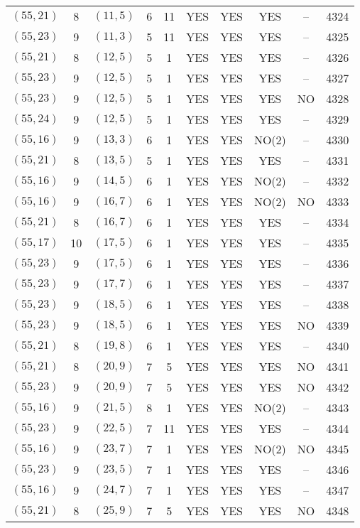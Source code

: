 \begin{longtable}{|c|c|c|c|c|c|c|c|c|c|}
$(55, 21)$ & 8 & $(11, 5)$ & 6 & 11 & YES & YES & YES & -- & 4324\\
$(55, 23)$ & 9 & $(11, 3)$ & 5 & 11 & YES & YES & YES & -- & 4325\\
$(55, 21)$ & 8 & $(12, 5)$ & 5 & 1 & YES & YES & YES & -- & 4326\\
$(55, 23)$ & 9 & $(12, 5)$ & 5 & 1 & YES & YES & YES & -- & 4327\\
$(55, 23)$ & 9 & $(12, 5)$ & 5 & 1 & YES & YES & YES & NO & 4328\\
$(55, 24)$ & 9 & $(12, 5)$ & 5 & 1 & YES & YES & YES & -- & 4329\\
$(55, 16)$ & 9 & $(13, 3)$ & 6 & 1 & YES & YES & NO(2) & -- & 4330\\
$(55, 21)$ & 8 & $(13, 5)$ & 5 & 1 & YES & YES & YES & -- & 4331\\
$(55, 16)$ & 9 & $(14, 5)$ & 6 & 1 & YES & YES & NO(2) & -- & 4332\\
$(55, 16)$ & 9 & $(16, 7)$ & 6 & 1 & YES & YES & NO(2) & NO & 4333\\
$(55, 21)$ & 8 & $(16, 7)$ & 6 & 1 & YES & YES & YES & -- & 4334\\
$(55, 17)$ & 10 & $(17, 5)$ & 6 & 1 & YES & YES & YES & -- & 4335\\
$(55, 23)$ & 9 & $(17, 5)$ & 6 & 1 & YES & YES & YES & -- & 4336\\
$(55, 23)$ & 9 & $(17, 7)$ & 6 & 1 & YES & YES & YES & -- & 4337\\
$(55, 23)$ & 9 & $(18, 5)$ & 6 & 1 & YES & YES & YES & -- & 4338\\
$(55, 23)$ & 9 & $(18, 5)$ & 6 & 1 & YES & YES & YES & NO & 4339\\
$(55, 21)$ & 8 & $(19, 8)$ & 6 & 1 & YES & YES & YES & -- & 4340\\
$(55, 21)$ & 8 & $(20, 9)$ & 7 & 5 & YES & YES & YES & NO & 4341\\
$(55, 23)$ & 9 & $(20, 9)$ & 7 & 5 & YES & YES & YES & NO & 4342\\
$(55, 16)$ & 9 & $(21, 5)$ & 8 & 1 & YES & YES & NO(2) & -- & 4343\\
$(55, 23)$ & 9 & $(22, 5)$ & 7 & 11 & YES & YES & YES & -- & 4344\\
$(55, 16)$ & 9 & $(23, 7)$ & 7 & 1 & YES & YES & NO(2) & NO & 4345\\
$(55, 23)$ & 9 & $(23, 5)$ & 7 & 1 & YES & YES & YES & -- & 4346\\
$(55, 16)$ & 9 & $(24, 7)$ & 7 & 1 & YES & YES & YES & -- & 4347\\
$(55, 21)$ & 8 & $(25, 9)$ & 7 & 5 & YES & YES & YES & NO & 4348\\

\end{longtable}
